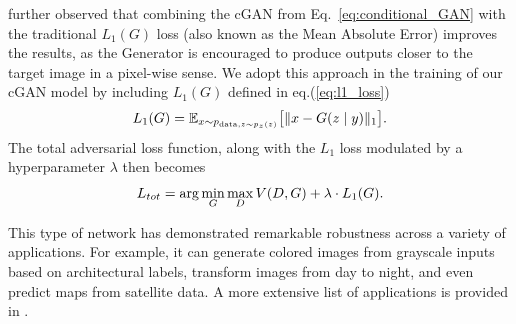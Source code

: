 \cite{isola2017image} further observed that combining the cGAN from Eq.~\eqref{eq:conditional_GAN} with the traditional $L_1(G)$ loss (also known  as the Mean Absolute Error) improves the results, as the Generator is encouraged to produce outputs closer to the target image in a pixel-wise sense. We adopt this approach in the training of our cGAN model by including $L_1(G)$ defined in eq.(\ref{eq:l1_loss})
\begin{equation}
	\centering
	L_1(G) = \mathbb{E}_{x \sim p_{\mathrm{data}, z \sim p_z(z)}} \bigl[ \lVert x - G(z \mid y) \rVert_{1} \bigr].
	\label{eq:l1_loss}
\end{equation}
The total adversarial loss function, along with the $L_1$ loss modulated by a hyperparameter $\lambda$ then becomes
\begin{equation}
	\centering
	L_{tot} = \arg \min_{G} \max_{D} V(D, G) + \lambda \cdot L_1(G).
	\label{eq:total_loss}
\end{equation}

This type of network has demonstrated remarkable robustness across a variety of applications. For example, it can generate colored images from grayscale inputs based on architectural labels, transform images from day to night, and even predict maps from satellite data. A more extensive list of applications is provided in \cite{isola2017image}.

